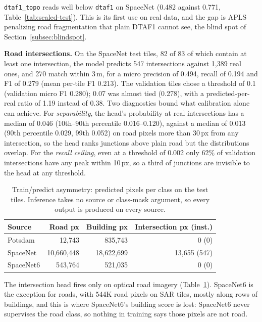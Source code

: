 \texttt{dtaf1\_topo} reads well below \texttt{dtaf1} on SpaceNet (0.482 against 0.771,
Table~\ref{tab:scaled-test}). This is its first use on real data, and the gap is APLS penalizing
road fragmentation that plain DTAF1 cannot see, the blind spot of Section~\ref{subsec:blindspot}.

\textbf{Road intersections.} On the SpaceNet test tiles, 82 of 83 of which contain at least one
intersection, the model predicts 547 intersections against 1,389 real ones, and 270 match within
3\,m, for a micro precision of 0.494, recall of 0.194 and F1 of 0.279 (mean per-tile F1 0.213). The
validation tiles chose a threshold of 0.1 (validation micro F1 0.280); 0.07 was almost tied (0.278),
with a predicted-per-real ratio of 1.19 instead of 0.38. Two diagnostics bound what calibration
alone can achieve. For \emph{separability}, the head's probability at real intersections has a
median of 0.046 (10th--90th percentile 0.016--0.120), against a median of 0.013 (90th percentile
0.029, 99th 0.052) on road pixels more than 30\,px from any intersection, so the head ranks
junctions above plain road but the distributions overlap. For the \emph{recall ceiling}, even at a
threshold of 0.002 only 62\% of validation intersections have any peak within 10\,px, so a third of
junctions are invisible to the head at any threshold.

\begin{table}
  \caption{Train/predict asymmetry: predicted pixels per class on the test tiles. Inference takes
  no source or class-mask argument, so every output is produced on every source.}
  \label{tab:scaled-asymmetry}
  \small
  \begin{tabular}{@{}lrrr@{}}
    \toprule
    Source & Road px & Building px & Intersection px (inst.) \\
    \midrule
    Potsdam & 12,743 & 835,743 & 0 (0) \\
    SpaceNet & 10,660,448 & 18,622,699 & 13,655 (547) \\
    SpaceNet6 & 543,764 & 521,035 & 0 (0) \\
    \bottomrule
  \end{tabular}
\end{table}

The intersection head fires only on optical road imagery (Table~\ref{tab:scaled-asymmetry}).
SpaceNet6 is the exception for roads, with 544K road pixels on SAR tiles, mostly along rows of
buildings, and this is where SpaceNet6's building score is lost: SpaceNet6 never supervises the road
class, so nothing in training says those pixels are not road.

